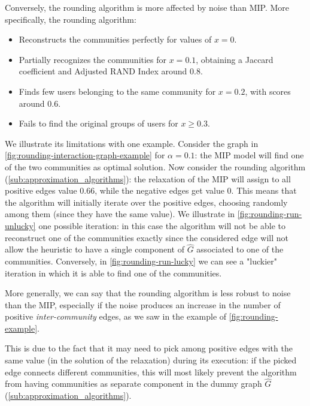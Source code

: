 Conversely, the rounding algorithm is more affected by noise than MIP. More
specifically, the rounding algorithm:
\begin{itemize}
	\item Reconstructs the communities perfectly for values of $x = 0$.
	\item Partially recognizes the communities for $x= 0.1$, obtaining a
	      Jaccard coefficient and Adjusted RAND Index around $0.8$.
	\item Finds few users belonging to the same community for $x = 0.2$, with
	      scores around $0.6$.
	\item Fails to find the original groups of users for $x \geq 0.3$.
\end{itemize}
We illustrate its limitations with one example. Consider the graph in
\autoref{fig:rounding-interaction-graph-example} for $\alpha = 0.1$:
the MIP model will find one of the two communities as optimal solution.
Now consider the rounding algorithm (\autoref{sub:approximation_algorithms}):
the relaxation of the MIP will assign to all positive edges value
$0.66$, while the negative edges get value $0$. This means that the algorithm
will initially iterate over the positive edges, choosing randomly among them (since they have the same value).
We illustrate in \autoref{fig:rounding-run-unlucky} one possible iteration: in
this case the algorithm will not be able to reconstruct one of the communities
exactly since the considered edge will not allow the heuristic to have a single component of
$\hat{G}$ associated to one of the communities.
Conversely, in \autoref{fig:rounding-run-lucky} we can see a "luckier"
iteration in which it is able to find one of the communities.

More generally, we can say that the rounding algorithm is less robust to noise
than the MIP, especially if the noise produces an increase in the number of
positive \emph{inter-community} edges, as we saw in the example of
\autoref{fig:rounding-example}.

This is due to the fact that it may need to pick among positive edges with the
same value (in the solution of the relaxation) during its execution: if the picked edge connects different communities, this will most
likely prevent the algorithm from having communities as separate component in
the dummy graph $\hat{G}$ (\autoref{sub:approximation_algorithms}).


